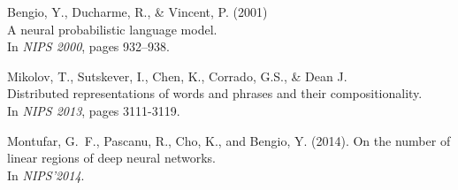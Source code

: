 \documentclass[]{article}
\begin{document}





Bengio, Y., Ducharme, R., \& Vincent, P. (2001)\\ A neural probabilistic
language model.\\ In {\it NIPS 2000}, pages 932--938.


Mikolov, T., Sutskever, I., Chen, K., Corrado, G.S., \& Dean
J.\\ Distributed representations of words and phrases and their
compositionality.\\ In {\it NIPS 2013}, pages 3111-3119.

Montufar, G.~F., Pascanu, R., Cho, K., and Bengio, Y. (2014).  On the
number of linear regions of deep neural networks.\\ In {\it NIPS'2014}.
\end{document}
